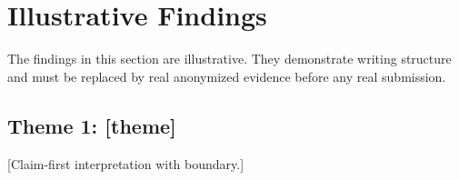 \section{Illustrative Findings}

\begin{tcolorbox}[noticebox,title={Simulated Findings Warning}]
\simulated{} The findings in this section are illustrative. They demonstrate writing structure and must be replaced by real anonymized evidence before any real submission.
\end{tcolorbox}

\subsection{Theme 1: [theme]}

\begin{tcolorbox}
\end{tcolorbox}

[Claim-first interpretation with boundary.]
